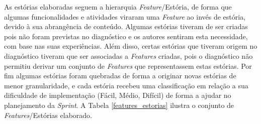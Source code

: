 As estórias elaboradas seguem a hierarquia \textit{Feature}/Estória, de forma que algumas funcionalidades e atividades viraram uma \textit{Feature} ao invés de estória, devido à sua abrangência de conteúdo. Algumas estórias tiveram de ser criadas pois não foram previstas no diagnóstico e os autores sentiram esta necessidade, com base nas suas experiências. Além disso, certas estórias que tiveram origem no diagnóstico tiveram que ser associadas a \textit{Features} criadas, pois o diagnóstico não permitiu derivar um conjunto de \textit{Features} que representassem estas estórias. Por fim algumas estórias foram quebradas de forma a originar novas estórias de menor granularidade, e cada estória recebeu uma classificação em relação a sua dificuldade de implementação (Fácil, Médio, Difícil) de forma a ajudar no planejamento da \textit{Sprint}. A Tabela \ref{features_estorias} ilustra o conjunto de \textit{Features}/Estórias elaborado.

